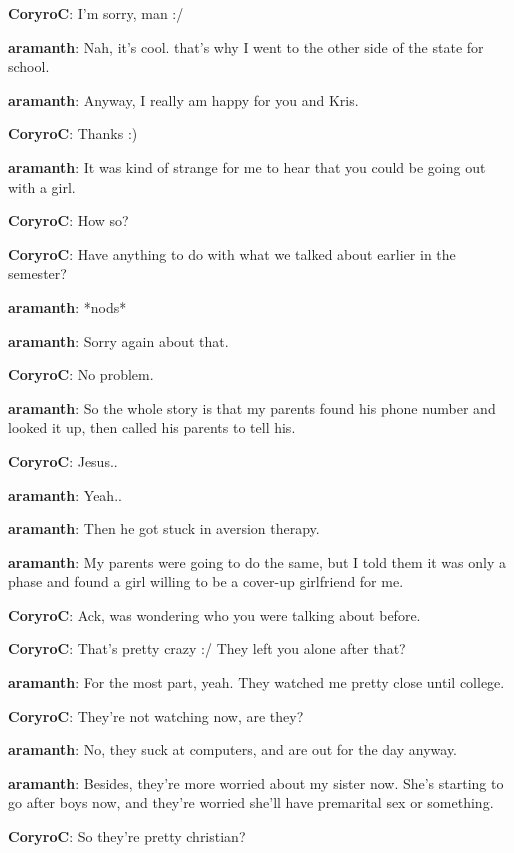 \textbf{\color{blue}CoryroC}: I'm sorry, man :/

\textbf{\color{red}aramanth}: Nah, it's cool.  that's why I went to the other side of the state for school.

\textbf{\color{red}aramanth}: Anyway, I really am happy for you and Kris.

\textbf{\color{blue}CoryroC}: Thanks :)

\textbf{\color{red}aramanth}: It was kind of strange for me to hear that you could be going out with a girl.

\textbf{\color{blue}CoryroC}: How so?

\textbf{\color{blue}CoryroC}: Have anything to do with what we talked about earlier in the semester?

\textbf{\color{red}aramanth}: *nods*

\textbf{\color{red}aramanth}: Sorry again about that.

\textbf{\color{blue}CoryroC}: No problem.

\textbf{\color{red}aramanth}: So the whole story is that my parents found his phone number and looked it up, then called his parents to tell his.

\textbf{\color{blue}CoryroC}: Jesus..

\textbf{\color{red}aramanth}: Yeah..

\textbf{\color{red}aramanth}: Then he got stuck in aversion therapy.

\textbf{\color{red}aramanth}: My parents were going to do the same, but I told them it was only a phase and found a girl willing to be a cover-up girlfriend for me.

\textbf{\color{blue}CoryroC}: Ack, was wondering who you were talking about before.

\textbf{\color{blue}CoryroC}: That's pretty crazy :/  They left you alone after that?

\textbf{\color{red}aramanth}: For the most part, yeah.  They watched me pretty close until college.

\textbf{\color{blue}CoryroC}: They're not watching now, are they?

\textbf{\color{red}aramanth}: No, they suck at computers, and are out for the day anyway.

\textbf{\color{red}aramanth}: Besides, they're more worried about my sister now.  She's starting to go after boys now, and they're worried she'll have premarital sex or something.

\textbf{\color{blue}CoryroC}: So they're pretty christian?

